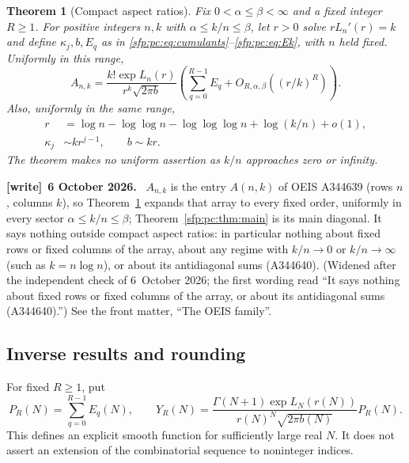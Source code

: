 \documentclass[11pt,letterpaper]{article}
\numberwithin{equation}{section}
\newtheorem{theorem}{Theorem}[section]
\theoremstyle{definition}\newtheorem{definition}[theorem]{Definition}
\theoremstyle{remark}\newtheorem{remark}[theorem]{Remark}
\newenvironment{writenote}[1][]{\par\smallskip\begingroup\small
 \noindent\textbf{[write]}\if\relax\detokenize{#1}\relax\else~\textbf{#1.}\fi\ }%
 {\par\endgroup\smallskip}
\begin{document}
\begin{theorem}[Compact aspect ratios]\label{sfp:pc:thm:aspect}
Fix $0<\alpha\leq\beta<\infty$ and a fixed integer $R\geq1$.
For positive integers $n,k$ with $\alpha\leq k/n\leq\beta$,
let $r>0$ solve $rL_n'(r)=k$ and define $\kappa_j,b,E_q$ as in
\eqref{sfp:pc:eq:cumulants}--\eqref{sfp:pc:eq:Ek}, with $n$ held fixed. Uniformly
in this range,
\begin{equation}\label{sfp:pc:eq:aspect}
 A_{n,k}=\frac{k!\exp L_n(r)}{r^k\sqrt{2\pi b}}
    \left(\sum_{q=0}^{R-1}E_q
          +O_{R,\alpha,\beta}\left((r/k)^R\right)\right).
\end{equation}
Also, uniformly in the same range,
\begin{align}
 r&=\log n-\log\log n-\log\log\log n
               +\log(k/n)+o(1),\label{sfp:pc:eq:aspectr}\\
 \kappa_j&\sim kr^{j-1},\qquad b\sim kr.
\end{align}
The theorem makes no uniform assertion as $k/n$ approaches zero or
infinity.
\end{theorem}
\begin{writenote}[6 October 2026]
$A_{n,k}$ is the entry $A(n,k)$ of OEIS A344639 (rows $n$, columns $k$), so Theorem~\ref{sfp:pc:thm:aspect} expands that array to every fixed order, uniformly in every sector $\alpha\le k/n\le\beta$; Theorem~\ref{sfp:pc:thm:main} is its main diagonal. It says nothing outside compact aspect ratios: in particular nothing about fixed rows or fixed columns of the array, about any regime with $k/n\to0$ or $k/n\to\infty$ (such as $k=n\log n$), or about its antidiagonal sums (A344640). \textup{(Widened after the independent check of 6~October 2026; the first wording read ``It says nothing about fixed rows or fixed columns of the array, or about its antidiagonal sums (A344640).'')} See the front matter, ``The OEIS family''.
\end{writenote}

\subsection{Inverse results and rounding}

For fixed $R\geq1$, put
\begin{equation}\label{sfp:pc:eq:YR}
 P_R(N)=\sum_{q=0}^{R-1}E_q(N),\qquad
 Y_R(N)=\frac{\Gamma(N+1)\exp L_N(r(N))}
                   {r(N)^N\sqrt{2\pi b(N)}}P_R(N).
\end{equation}
This defines an explicit smooth function for sufficiently large real
$N$. It does not assert an extension of the combinatorial sequence
to noninteger indices.
\end{document}
